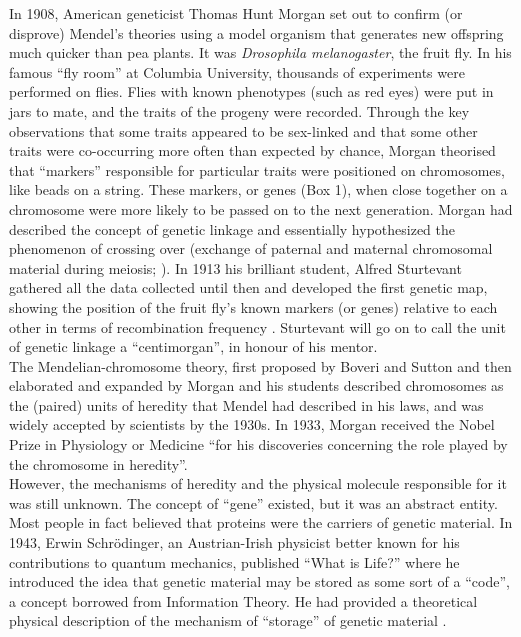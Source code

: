 In 1908, American geneticist Thomas Hunt Morgan set out to confirm (or disprove) Mendel’s theories using a model organism that generates new offspring much quicker than pea plants. 
It was \textit{Drosophila melanogaster}, the fruit fly. 
In his famous “fly room” at Columbia University, thousands of experiments were performed on flies. 
Flies with known phenotypes (such as red eyes) were put in jars to mate, and the traits of the progeny were recorded. 
Through the key observations that some traits appeared to be sex-linked and that some other traits were co-occurring more often than expected by chance, Morgan theorised that “markers” responsible for particular traits were positioned on chromosomes, like beads on a string. 
These markers, or genes (Box 1), when close together on a chromosome were more likely to be passed on to the next generation. 
Morgan had described the concept of genetic linkage and essentially hypothesized the phenomenon of crossing over (exchange of paternal and maternal chromosomal material during meiosis; \cite{morgan1911random}). 
In 1913 his brilliant student, Alfred Sturtevant gathered all the data collected until then and developed the first genetic map, showing the position of the fruit fly’s known markers (or genes) relative to each other in terms of recombination frequency \cite{sturtevant1913linear}. 
Sturtevant will go on to call the unit of genetic linkage a “centimorgan”, in honour of his mentor.\\

The Mendelian-chromosome theory, first proposed by Boveri and Sutton \cite{sutton1903chromosomes} and then elaborated and expanded by Morgan and his students \cite{morgan1915mechanism} described chromosomes as the (paired) units of heredity that Mendel had described in his laws, and was widely accepted by scientists by the 1930s. 
In 1933, Morgan received the Nobel Prize in Physiology or Medicine “for his discoveries concerning the role played by the chromosome in heredity”.\\

However, the mechanisms of heredity and the physical molecule responsible for it was still unknown. 
The concept of “gene” existed, but it was an abstract entity. 
Most people in fact believed that proteins were the carriers of genetic material. 
In 1943, Erwin  Schrödinger, an Austrian-Irish physicist better known for his contributions to quantum mechanics, published “What is Life?” where he introduced the idea that genetic material may be stored as some sort of a “code”, a concept borrowed from Information Theory. 
He had provided a theoretical physical description of the mechanism of “storage” of genetic material \cite{mukherjee2016gene}.

